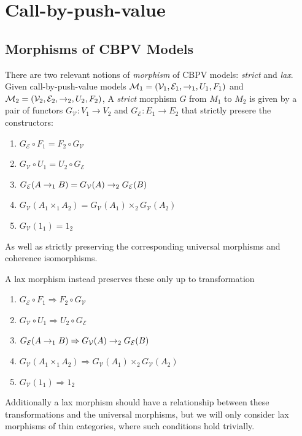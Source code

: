 \section{Call-by-push-value}

\subsection{Morphisms of CBPV Models}

There are two relevant notions of \emph{morphism} of CBPV models:
\emph{strict} and \emph{lax}.
Given call-by-push-value models
$\mathcal M_1 = (\mathcal V_1, \mathcal E_1, \to_1, U_1, F_1)$ and
$\mathcal M_2 = (\mathcal V_2, \mathcal E_2, \to_2, U_2, F_2)$,
A \emph{strict} morphism $G$ from $M_1$ to $M_2$ is given by a pair of functors
$G_{\mathcal{V}}: V_1 \to V_2$ and $G_{\mathcal{E}} : E_1 \to E_2$
that strictly presere the constructors:
\begin{enumerate}
  \item $G_{\mathcal{E}} \circ F_1 = F_2 \circ G_{\mathcal{V}}$
  \item $G_{\mathcal{V}} \circ U_1 = U_2 \circ G_{\mathcal{E}}$
  \item $G_{\mathcal{E}}(A \to_1 B) = G_{\mathcal{V}}(A) \to_2 G_{\mathcal{E}}(B)$
  \item $G_{\mathcal{V}}(A_1 \times_1 A_2) = G_{\mathcal{V}}(A_1) \times_2 G_{\mathcal{V}}(A_2)$
  \item $G_{\mathcal{V}}(1_1) = 1_2$
\end{enumerate}
As well as strictly preserving the corresponding universal morphisms
and coherence isomorphisms.

A lax morphism instead preserves these only up to transformation
\begin{enumerate}
  \item $G_{\mathcal{E}} \circ F_1 \Rightarrow F_2 \circ G_{\mathcal{V}}$
  \item $G_{\mathcal{V}} \circ U_1 \Rightarrow U_2 \circ G_{\mathcal{E}}$
  \item $G_{\mathcal{E}}(A \to_1 B) \Rightarrow G_{\mathcal{V}}(A) \to_2 G_{\mathcal{E}}(B)$
  \item $G_{\mathcal{V}}(A_1 \times_1 A_2) \Rightarrow G_{\mathcal{V}}(A_1) \times_2 G_{\mathcal{V}}(A_2)$
  \item $G_{\mathcal{V}}(1_1) \Rightarrow 1_2$
\end{enumerate}
Additionally a lax morphism should have a relationship between these
transformations and the universal morphisms, but we will only consider
lax morphisms of thin categories, where such conditions hold
trivially.

